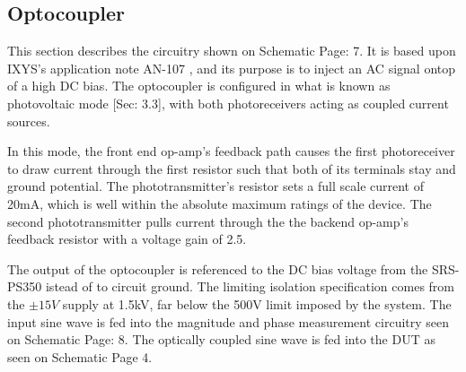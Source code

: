 \subsection{Optocoupler}
\label{sec:opto}

This section describes the circuitry shown on Schematic Page: 7. It is based upon IXYS's application note AN-107 \cite{locAppNote}, and its purpose is to inject an AC signal ontop of a high DC bias. The optocoupler is configured in what is known as photovoltaic mode \cite{locAppNote}[Sec: 3.3], with both photoreceivers acting as coupled current sources.

In this mode, the front end op-amp's feedback path causes the first photoreceiver to draw current through the first resistor such that both of its terminals stay and ground potential. The phototransmitter's resistor sets a full scale current of 20mA, which is well within the absolute maximum ratings of the device. The second phototransmitter pulls current through the the backend op-amp's feedback resistor with a voltage gain of 2.5.

The output of the optocoupler is referenced to the DC bias voltage from the SRS-PS350 istead of to circuit ground. The limiting isolation specification comes from the $\pm 15V$ supply at 1.5kV, far below the 500V limit imposed by the system. The input sine wave is fed into the magnitude and phase measurement circuitry seen on Schematic Page: 8. The optically coupled sine wave is fed into the DUT as seen on Schematic Page 4.

